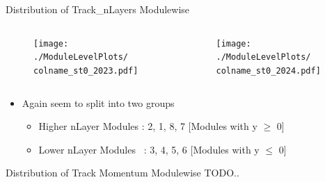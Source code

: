 \begin{frame}{Distribution of Track\_nLayers Modulewise}
    \newcommand{\colname}{Track_nLayers}
    \begin{columns}
        \begin{column}{0.6\linewidth}
            \begin{figure}
                \centering
                \texttt{[image: ./ModuleLevelPlots/\\colname\_st0\_2023.pdf]}
            \end{figure}
        \end{column}
        \begin{column}{0.6\linewidth}
            \begin{figure}
                \centering
                \texttt{[image: ./ModuleLevelPlots/\\colname\_st0\_2024.pdf]}
            \end{figure}
        \end{column}
    \end{columns}

    \begin{itemize}
        \small
        \item Again seem to split into two groups
        \begin{itemize}
            \item Higher nLayer Modules : 2, 1, 8, 7 [Modules with y $\geq$ 0]
            \item Lower nLayer Modules \ : 3, 4, 5, 6  [Modules with y $\leq$ 0]
        \end{itemize}
    \end{itemize}
\end{frame}


\begin{frame}{Distribution of Track Momentum Modulewise}
    TODO..
\end{frame}

